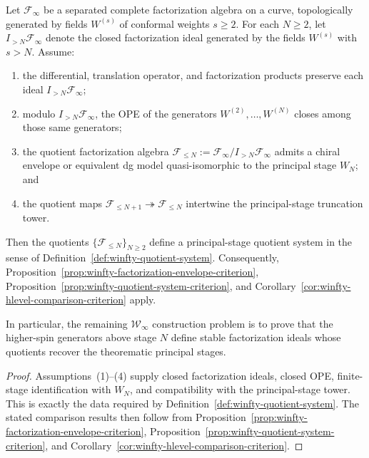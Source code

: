 \begin{proposition}
\label{prop:winfty-higher-spin-ideal-criterion}
Let $\mathcal{F}_\infty$ be a separated complete factorization algebra
on a curve, topologically generated by fields
$W^{(s)}$ of conformal weights $s \ge 2$.  For each $N \ge 2$, let
$I_{>N}\mathcal{F}_\infty$ denote the closed factorization ideal
generated by the fields $W^{(s)}$ with $s > N$.  Assume:
\begin{enumerate}
\item the differential, translation operator, and factorization
  products preserve each ideal $I_{>N}\mathcal{F}_\infty$;
\item modulo $I_{>N}\mathcal{F}_\infty$, the OPE of the generators
  $W^{(2)},\dots,W^{(N)}$ closes among those same generators;
\item the quotient factorization algebra
  $\mathcal{F}_{\le N}:=\mathcal{F}_\infty/I_{>N}\mathcal{F}_\infty$
  admits a chiral envelope or equivalent dg model quasi-isomorphic to
  the principal stage $W_N$; and
\item the quotient maps
  $\mathcal{F}_{\le N+1}\twoheadrightarrow \mathcal{F}_{\le N}$
  intertwine the principal-stage truncation tower.
\end{enumerate}
Then the quotients $\{\mathcal{F}_{\le N}\}_{N \ge 2}$ define a
principal-stage quotient system in the sense of
Definition~\ref{def:winfty-quotient-system}.  Consequently,
Proposition~\ref{prop:winfty-factorization-envelope-criterion},
Proposition~\ref{prop:winfty-quotient-system-criterion}, and
Corollary~\ref{cor:winfty-hlevel-comparison-criterion} apply.

In particular, the remaining $\mathcal{W}_\infty$ construction problem
is to prove that the higher-spin generators above stage $N$ define
stable factorization ideals whose quotients recover the theorematic
principal stages.
\end{proposition}

\begin{proof}
Assumptions~\textup{(1)--(4)} supply closed factorization ideals, closed OPE, finite-stage identification with
$W_N$, and compatibility with the
principal-stage tower.  This is exactly the data required by
Definition~\ref{def:winfty-quotient-system}.  The stated comparison
results then follow from
Proposition~\ref{prop:winfty-factorization-envelope-criterion},
Proposition~\ref{prop:winfty-quotient-system-criterion}, and
Corollary~\ref{cor:winfty-hlevel-comparison-criterion}.
\end{proof}

